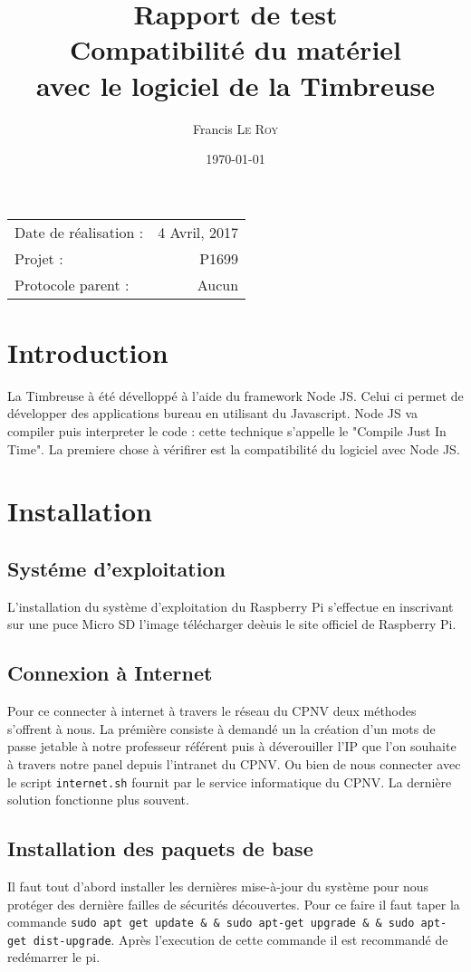 \documentclass[10pt,a4paper,onecolumn]{article}
\title{Rapport de test \\ Compatibilité du matériel \\ avec le logiciel de la Timbreuse}
\author{Francis \textsc{Le Roy}}
\date{\today}
\begin{document}
\maketitle
\thispagestyle{fancy}

\begin{center}
\begin{tabular}{l r}
Date de réalisation : & 4 Avril, 2017 \\
Projet : & P1699 \\
Protocole parent : & Aucun
\end{tabular}
\end{center}


\section{Introduction}
La Timbreuse à été dévelloppé à l'aide du framework Node JS. Celui ci permet de développer des applications bureau en utilisant du Javascript.
Node JS va compiler puis interpreter le code : cette technique s'appelle le "Compile Just In Time". La premiere chose à vérifirer est la
compatibilité du logiciel avec Node JS.
\section{Installation}
\subsection{Systéme d'exploitation}
L'installation du système d'exploitation du Raspberry Pi s'effectue en inscrivant sur une puce Micro SD l'image télécharger deèuis le site officiel
de Raspberry Pi.
\subsection{Connexion à Internet}
Pour ce connecter à internet à travers le réseau du CPNV deux méthodes s'offrent à nous. La prémière consiste à demandé un la création d'un mots de passe
jetable à notre professeur référent puis à déverouiller l'IP que l'on souhaite à travers notre panel depuis l'intranet du CPNV. Ou bien de nous connecter
avec le script \texttt{internet.sh} fournit par le service informatique du CPNV. La dernière solution fonctionne plus souvent.

\subsection{Installation des paquets de base}
Il faut tout d'abord installer les dernières mise-à-jour du système pour nous protéger des dernière failles de sécurités découvertes.
Pour ce faire il faut taper la commande \texttt{sudo apt\- get update \& \&  sudo apt-get upgrade \& \&  sudo apt-get dist-upgrade}. Après l'execution de cette commande
il est recommandé de redémarrer le pi.
\end{document}
